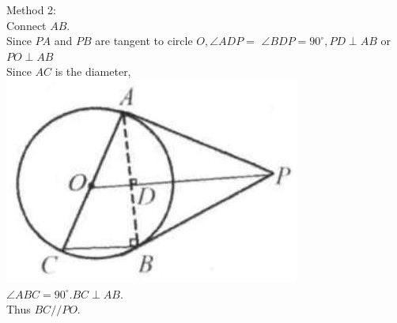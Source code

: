 \documentclass{article}
\begin{document}
Method 2:\\
Connect \(A B\).\\
Since \(P A\) and \(P B\) are tangent to circle \(O, \angle A D P=\) \(\angle B D P=90^{\circ}, P D \perp A B\) or \(P O \perp A B\)\\
Since \(A C\) is the diameter,\\
\includegraphics[width=\textwidth]{images/171(2).jpg} \(\angle A B C=90^{\circ} . B C \perp A B\).\\
Thus \(B C / / P O\).
\end{document}
